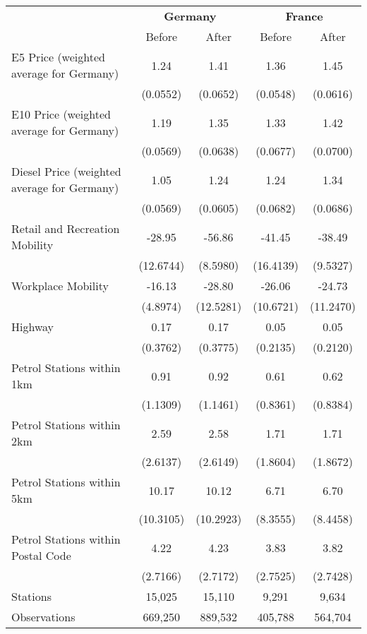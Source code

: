 \begin{tabular}{l*{4}{c}}
\toprule
                    &\multicolumn{2}{c}{\textbf{Germany}}&\multicolumn{2}{c}{\textbf{France}}\\\cmidrule(lr){2-3}\cmidrule(lr){4-5}
                    &\multicolumn{1}{c}{Before}&\multicolumn{1}{c}{After}&\multicolumn{1}{c}{Before}&\multicolumn{1}{c}{After}\\
\midrule
E5 Price (weighted average for Germany)&        1.24&        1.41&        1.36&        1.45\\
                    &    (0.0552)&    (0.0652)&    (0.0548)&    (0.0616)\\
E10 Price (weighted average for Germany)&        1.19&        1.35&        1.33&        1.42\\
                    &    (0.0569)&    (0.0638)&    (0.0677)&    (0.0700)\\
Diesel Price (weighted average for Germany)&        1.05&        1.24&        1.24&        1.34\\
                    &    (0.0569)&    (0.0605)&    (0.0682)&    (0.0686)\\
Retail and Recreation Mobility&      -28.95&      -56.86&      -41.45&      -38.49\\
                    &   (12.6744)&    (8.5980)&   (16.4139)&    (9.5327)\\
Workplace Mobility  &      -16.13&      -28.80&      -26.06&      -24.73\\
                    &    (4.8974)&   (12.5281)&   (10.6721)&   (11.2470)\\
Highway             &        0.17&        0.17&        0.05&        0.05\\
                    &    (0.3762)&    (0.3775)&    (0.2135)&    (0.2120)\\
Petrol Stations within 1km&        0.91&        0.92&        0.61&        0.62\\
                    &    (1.1309)&    (1.1461)&    (0.8361)&    (0.8384)\\
Petrol Stations within 2km&        2.59&        2.58&        1.71&        1.71\\
                    &    (2.6137)&    (2.6149)&    (1.8604)&    (1.8672)\\
Petrol Stations within 5km&       10.17&       10.12&        6.71&        6.70\\
                    &   (10.3105)&   (10.2923)&    (8.3555)&    (8.4458)\\
Petrol Stations within Postal Code&        4.22&        4.23&        3.83&        3.82\\
                    &    (2.7166)&    (2.7172)&    (2.7525)&    (2.7428)\\
\midrule
Stations            &      15,025&      15,110&       9,291&       9,634\\
Observations        &     669,250&     889,532&     405,788&     564,704\\
\bottomrule
\end{tabular}

